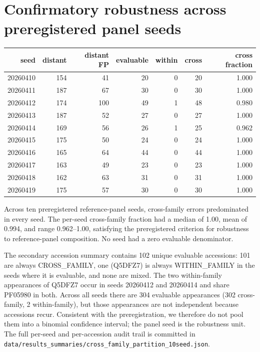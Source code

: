 \documentclass[11pt]{article}
\begin{document}
\section{Confirmatory robustness across preregistered panel seeds}
\begin{center}\small
\begin{tabular}{rrrrrrr}
\toprule
seed & distant & distant FP & evaluable & within & cross & cross fraction \\
\midrule
20260410 & 154 & 41  & 20 & 0 & 20 & 1.000 \\
20260411 & 187 & 67  & 30 & 0 & 30 & 1.000 \\
20260412 & 174 & 100 & 49 & 1 & 48 & 0.980 \\
20260413 & 187 & 52  & 27 & 0 & 27 & 1.000 \\
20260414 & 169 & 56  & 26 & 1 & 25 & 0.962 \\
20260415 & 175 & 50  & 24 & 0 & 24 & 1.000 \\
20260416 & 165 & 64  & 44 & 0 & 44 & 1.000 \\
20260417 & 163 & 49  & 23 & 0 & 23 & 1.000 \\
20260418 & 162 & 63  & 31 & 0 & 31 & 1.000 \\
20260419 & 175 & 57  & 30 & 0 & 30 & 1.000 \\
\bottomrule
\end{tabular}
\end{center}

Across ten preregistered reference-panel seeds, cross-family errors predominated in every seed. The per-seed cross-family fraction had a median of 1.00, mean of 0.994, and range 0.962--1.00, satisfying the preregistered criterion for robustness to reference-panel composition. No seed had a zero evaluable denominator.

The secondary accession summary contains 102 unique evaluable accessions: 101 are always CROSS\_FAMILY, one (Q5DFZ7) is always WITHIN\_FAMILY in the seeds where it is evaluable, and none are mixed. The two within-family appearances of Q5DFZ7 occur in seeds 20260412 and 20260414 and share PF05980 in both. Across all seeds there are 304 evaluable appearances (302 cross-family, 2 within-family), but those appearances are not independent because accessions recur. Consistent with the preregistration, we therefore do not pool them into a binomial confidence interval; the panel seed is the robustness unit. The full per-seed and per-accession audit trail is committed in \texttt{data/results\_summaries/cross\_family\_partition\_10seed.json}.
\end{document}
